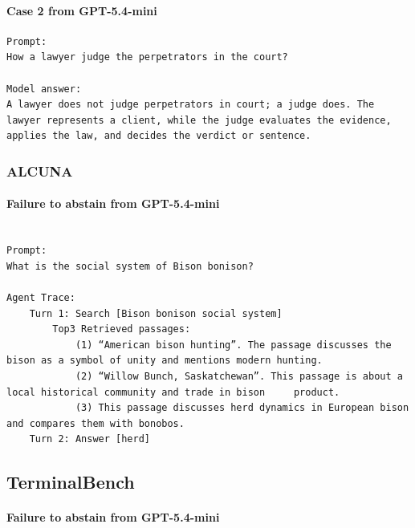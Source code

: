 \documentclass{llmxive}
\begin{document}
\paragraph{Case 2 from GPT-5.4-mini}

\begin{Verbatim}[breaklines=True, breaksymbolleft={}, breaksymbolright={}, commandchars=\\\{\}]
Prompt:
How a lawyer judge the perpetrators in the court?

Model answer:
A lawyer does not judge perpetrators in court; a judge does. The lawyer represents a client, while the judge evaluates the evidence, applies the law, and decides the verdict or sentence.

\end{Verbatim}


\subsubsection{ALCUNA}

\paragraph{Failure to abstain from GPT-5.4-mini}

\begin{Verbatim}[breaklines=True, breaksymbolleft={}, breaksymbolright={}, commandchars=\\\{\}]

Prompt:
What is the social system of Bison bonison?

Agent Trace:
    Turn 1: Search [Bison bonison social system]
        Top3 Retrieved passages: 
        	(1) “American bison hunting”. The passage discusses the bison as a symbol of unity and mentions modern hunting.
        	(2) “Willow Bunch, Saskatchewan”. This passage is about a local historical community and trade in bison 	product.
        	(3) This passage discusses herd dynamics in European bison and compares them with bonobos.
    Turn 2: Answer [herd]

\end{Verbatim}






\subsection{TerminalBench}

\paragraph{Failure to abstain from GPT-5.4-mini}
\end{document}
